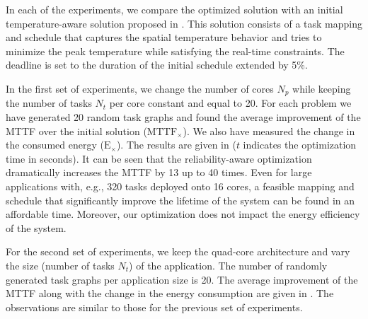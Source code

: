 In each of the experiments, we compare the optimized solution with an initial
temperature-aware solution proposed in \cite{xie2006}. This solution consists of
a task mapping and schedule that captures the spatial temperature behavior and
tries to minimize the peak temperature while satisfying the real-time
constraints. The deadline is set to the duration of the initial schedule
extended by 5\%.

In the first set of experiments, we change the number of cores $N_p$ while
keeping the number of tasks $N_t$ per core constant and equal to 20. For each
problem we have generated 20 random task graphs and found the average
improvement of the MTTF over the initial solution ($\scriptstyle
\text{MTTF}_\times$). We also have measured the change in the consumed energy
($\scriptstyle \text{E}_\times$). The results are given in 
($t$ indicates the optimization time in seconds). It can be seen that the
reliability-aware optimization dramatically increases the MTTF by 13 up to 40
times. Even for large applications with, e.g., 320 tasks deployed onto 16 cores,
a feasible mapping and schedule that significantly improve the lifetime of the
system can be found in an affordable time. Moreover, our optimization does not
impact the energy efficiency of the system.

For the second set of experiments, we keep the quad-core architecture and vary
the size (number of tasks $N_t$) of the application. The number of randomly
generated task graphs per application size is 20. The average improvement of the
MTTF along with the change in the energy consumption are given in
. The observations are similar to those for the previous set of
experiments.

